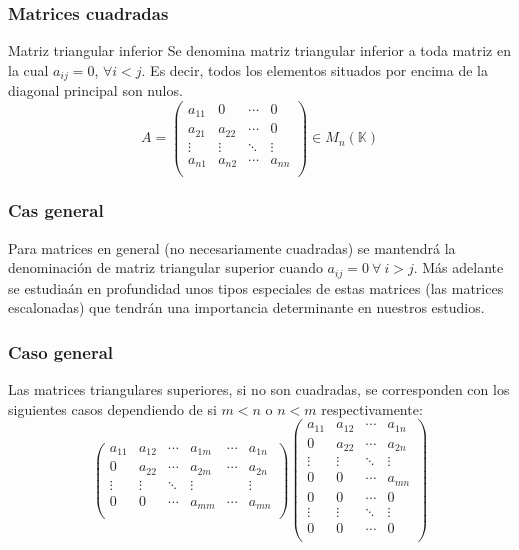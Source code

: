 \documentclass[aspectratio=169]{beamer}
\begin{document}
 \begin{frame}
  \frametitle{Matrices cuadradas}
   \begin{block}{Matriz triangular inferior}
Se denomina matriz triangular inferior a toda matriz en la cual  $a_{ij} = 0$,  $\forall i < j $. Es decir, todos los elementos situados por encima de la diagonal principal son nulos.
\[ A =  \left(\begin{matrix} %
      a_{11} & 0 & \cdots & 0 \\
      a_{21} & a_{22} & \cdots & 0 \\
  \vdots & \vdots & \ddots & \vdots \\
   a_{n1} & a_{n2} & \cdots & a_{nn} \\
    \end{matrix}\right) \in M_{ n} (\mathbb{K})\]
  \end{block}
 \end{frame}
 
 
  \begin{frame}
  \frametitle{Cas general}
  
Para matrices en general (no necesariamente cuadradas) se mantendr\'a la denominaci\'on de matriz triangular superior cuando $a_{ij} = 0\ \forall \ i > j$. M\'as adelante se estudia\'an en profundidad unos tipos especiales de estas matrices (las matrices escalonadas) que tendr\'an una importancia determinante en nuestros estudios.  
 \end{frame}


  \begin{frame}
  \frametitle{Caso general}
  Las matrices triangulares superiores, si no son cuadradas, se corresponden con los siguientes casos dependiendo de si $m < n$ o $n < m$ respectivamente:
\[   \left(\begin{matrix} %
      a_{11} & a_{12} & \cdots & a_{1m} & \cdots & a_{1n}  \\
      0 & a_{22} & \cdots & a_{2m} & \cdots & a_{2n} \\
  \vdots & \vdots & \ddots & \vdots & &\vdots \\
   0 & 0 & \cdots & a_{mm} & \cdots & a_{mn} \\
    \end{matrix}\right) 
     \left(\begin{matrix} %
      a_{11} & a_{12} & \cdots & a_{1n}  \\
      0 & a_{22} & \cdots & a_{2n} \\
  \vdots & \vdots & \ddots & \vdots \\
   0 & 0 & \cdots  & a_{mn} \\
   0 & 0 & \cdots  & 0 \\
     \vdots & \vdots & \ddots & \vdots \\
   0 & 0 & \cdots  & 0 \\
    \end{matrix}\right) \]
 \end{frame}
\end{document}
